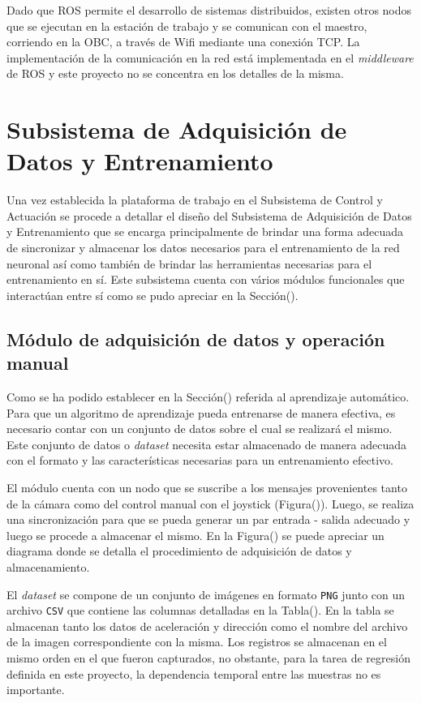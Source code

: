     Dado que ROS permite el desarrollo de sistemas distribuidos, existen otros nodos que se ejecutan en la estación de trabajo y 
    se comunican con el maestro, corriendo en la OBC, a través de Wifi mediante una conexión TCP. La implementación de la comunicación 
    en la red está implementada en el \textit{middleware} de ROS y este proyecto no se concentra en los detalles de la misma.

\section{Subsistema de Adquisición de Datos y Entrenamiento}

Una vez establecida la plataforma de trabajo en el Subsistema de Control y Actuación se procede a detallar el diseño del 
Subsistema de Adquisición de Datos y Entrenamiento que se encarga principalmente de brindar una forma adecuada de sincronizar 
y almacenar los datos necesarios para el entrenamiento de la red neuronal así como también de brindar las herramientas necesarias 
para el entrenamiento en sí. Este subsistema cuenta con vários módulos funcionales que interactúan entre sí como se pudo apreciar 
en la Sección(). 


    \subsection{Módulo de adquisición de datos y operación manual}
    Como se ha podido establecer en la Sección() referida al aprendizaje automático. Para que un algoritmo de aprendizaje pueda 
    entrenarse de manera efectiva, es necesario contar con un conjunto de datos sobre el cual se realizará el mismo. Este conjunto 
    de datos o \textit{dataset} necesita estar almacenado de manera adecuada con el formato y las características necesarias para 
    un entrenamiento efectivo.

    El módulo cuenta con un nodo que se suscribe a los mensajes provenientes tanto de la cámara como del control manual con el 
    joystick (Figura()). Luego, se realiza una sincronización para que se pueda generar un par entrada - salida adecuado y luego se procede 
    a almacenar el mismo. En la Figura() se puede apreciar un diagrama donde se detalla el procedimiento de adquisición de datos
    y almacenamiento.


    El \textit{dataset} se compone de un conjunto de imágenes en formato \lstinline{PNG} junto con un archivo \lstinline{CSV} que 
    contiene las columnas detalladas en la Tabla(). En la tabla se almacenan tanto los datos de aceleración y dirección como el 
    nombre del archivo de la imagen correspondiente con la misma. Los registros se almacenan en el mismo orden en el que fueron 
    capturados, no obstante, para la tarea de regresión definida en este proyecto, la dependencia temporal entre las muestras 
    no es importante. 

